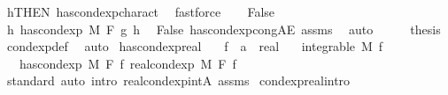 \begin{isabellebody}
\ h{\isacharbrackleft}{\kern0pt}THEN\ has{\isacharunderscore}{\kern0pt}cond{\isacharunderscore}{\kern0pt}exp{\isacharunderscore}{\kern0pt}charact{\isacharparenleft}{\kern0pt}{}{\isacharparenright}{\kern0pt}{\isacharbrackright}{\kern0pt}\ \isamarkupfalse%
\ fastforce\isanewline
{}\isamarkupfalse%
\isanewline
\ \ \isamarkupfalse%
\ False\isanewline
\ \ \isamarkupfalse%
\ \isamarkupfalse%
\ {\isachardoublequoteopen}{\isasymnexists}h{\isachardot}{\kern0pt}\ has{\isacharunderscore}{\kern0pt}cond{\isacharunderscore}{\kern0pt}exp\ M\ F\ g\ h{\isachardoublequoteclose}\ \isamarkupfalse%
\ False\ has{\isacharunderscore}{\kern0pt}cond{\isacharunderscore}{\kern0pt}exp{\isacharunderscore}{\kern0pt}cong{\isacharunderscore}{\kern0pt}AE\ assms\ \isamarkupfalse%
\ auto\isanewline
\ \ \isamarkupfalse%
\ \isamarkupfalse%
\ {\isacharquery}{\kern0pt}thesis\ \isamarkupfalse%
\ cond{\isacharunderscore}{\kern0pt}exp{\isacharunderscore}{\kern0pt}def\ \isamarkupfalse%
\ auto\isanewline
{}\isamarkupfalse%
%
\endisatagproof
{\isafoldproof}%
%
\isadelimproof
\isanewline
%
\endisadelimproof
\isanewline
{}\isamarkupfalse%
\ has{\isacharunderscore}{\kern0pt}cond{\isacharunderscore}{\kern0pt}exp{\isacharunderscore}{\kern0pt}real{\isacharcolon}{\kern0pt}\isanewline
\ \ \ f\ {\isacharcolon}{\kern0pt}{\isacharcolon}{\kern0pt}\ {\isachardoublequoteopen}{\isacharprime}{\kern0pt}a\ {\isasymRightarrow}\ real{\isachardoublequoteclose}\isanewline
\ \ \ {\isachardoublequoteopen}integrable\ M\ f{\isachardoublequoteclose}\isanewline
\ \ \ {\isachardoublequoteopen}has{\isacharunderscore}{\kern0pt}cond{\isacharunderscore}{\kern0pt}exp\ M\ F\ f\ {\isacharparenleft}{\kern0pt}real{\isacharunderscore}{\kern0pt}cond{\isacharunderscore}{\kern0pt}exp\ M\ F\ f{\isacharparenright}{\kern0pt}{\isachardoublequoteclose}\isanewline
%
\isadelimproof
\ \ %
\endisadelimproof
%
\isatagproof
{}\isamarkupfalse%
\ {\isacharparenleft}{\kern0pt}standard{\isacharcomma}{\kern0pt}\ auto\ intro{\isacharbang}{\kern0pt}{\isacharcolon}{\kern0pt}\ real{\isacharunderscore}{\kern0pt}cond{\isacharunderscore}{\kern0pt}exp{\isacharunderscore}{\kern0pt}intA\ assms{\isacharparenright}{\kern0pt}%
\endisatagproof
{\isafoldproof}%
%
\isadelimproof
\isanewline
%
\endisadelimproof
\isanewline
{}\isamarkupfalse%
\ cond{\isacharunderscore}{\kern0pt}exp{\isacharunderscore}{\kern0pt}real{\isacharbrackleft}{\kern0pt}intro{\isacharbrackright}{\kern0pt}{\isacharcolon}{\kern0pt}\isanewline

\end{isabellebody}
